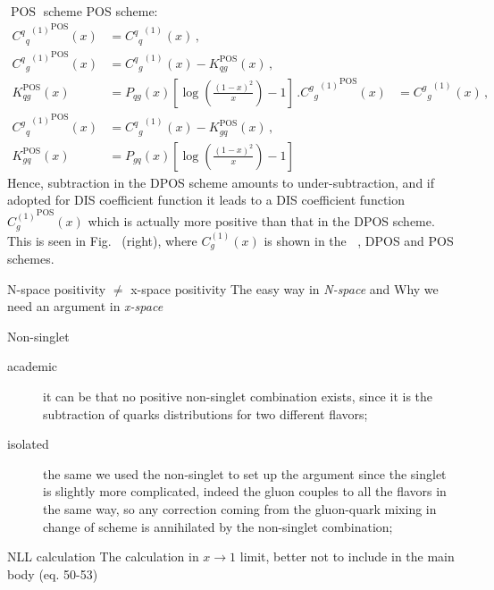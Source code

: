 \documentclass[9pt]{beamer}
\DeclareMathOperator{\msbar}{\overline{MS}}
\DeclareMathOperator{\pos}{POS}
\begin{document}
\begin{frame}{$\pos$ scheme}
POS scheme:
\begin{align*}
 {{C^q{}_q}^{(1)}}^{\pos}(x) &=  {{C^q{}_q}^{(1)}}^{\msbar}(x) \,, \\
 {{C^q{}_g}^{(1)}}^{\pos} (x) &=  {{C^q{}_g}^{(1)}}^{\msbar} (x) - K_{qg}^{\pos} (x) \,,\\
  K_{qg}^{\pos} (x) &=  P_{qg}(x)\left[\log(\frac{(1-x)^2}{x}) - 1\right] \,.
 {{C^g{}_g}^{(1)}}^{\pos}(x)  &=  {{C^g{}_g}^{(1)}}^{\msbar}(x) \,, \\
 {{C^g{}_q}^{(1)}}^{\pos} (x) &=  {{C^q{}_g}^{(1)}}^{\msbar} (x) - K_{gq}^{\pos} (x) \,,\\
  K_{gq}^{\pos} (x) &=  P_{gq}(x)\left[\log(\frac{(1-x)^2}{x})- 1\right]
\end{align*}
Hence, subtraction in the
DPOS scheme amounts to under-subtraction, and if adopted for DIS
coefficient function it leads to a DIS coefficient function
${C^{(1)}_{g}}^{\pos}(x)$ which is actually more positive than that
in the DPOS scheme. This is seen in Fig.~ (right), where
${C^{(1)}_{g}}(x)$ is shown in the $\msbar$, DPOS and POS schemes.
\end{frame}

\begin{frame}{N-space positivity $\neq$ x-space positivity}
    The easy way in \textit{N-space} and Why we need an argument in \textit{x-space}
\end{frame}

\begin{frame}{Non-singlet}
    \begin{description}
        \item[academic] it can be that no positive non-singlet combination
            exists, since it is the subtraction of quarks distributions for two
            different flavors;
        \item[isolated] the same we used the non-singlet to set up the argument
            since the singlet is slightly more complicated, indeed the gluon
            couples to all the flavors in the same way, so any correction
            coming from the gluon-quark mixing in change of scheme is
            annihilated by the non-singlet combination;
    \end{description}
\end{frame}

\begin{frame}{NLL calculation}
    The calculation in $x \to 1$ limit, better not to include in the main body (eq. 50-53)
\end{frame}
\end{document}
